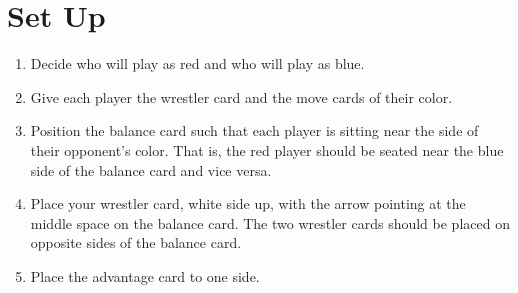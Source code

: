 \section*{Set Up}
\begin{enumerate}[leftmargin=*]
\item Decide who will play as red and who will play as blue.
\item Give each player the wrestler card and the move cards of their color.
\item Position the balance card such that each player is sitting near the side of their opponent's color. That is, the red player should be seated near the blue side of the balance card and vice versa.
\item Place your wrestler card, white side up, with the arrow pointing at the middle space on the balance card. The two wrestler cards should be placed on opposite sides of the balance card.
\item Place the advantage card to one side.
\end{enumerate}
